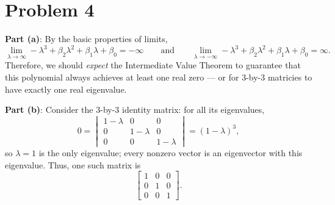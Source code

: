 \documentclass[11pt]{article}
\begin{document}
\section{Problem 4}

\textbf{Part (a)}: By the basic properties of limits,
\[
	\lim\limits_{\lambda \to \infty} -\lambda^{3} + \beta_{2} \lambda^{2} + \beta_{1} \lambda + \beta_{0} = -\infty \qquad \text{and} \qquad \lim\limits_{\lambda \to -\infty} -\lambda^{3} + \beta_{2} \lambda^{2} + \beta_{1} \lambda + \beta_{0} = \infty.
\]
Therefore, we should \textit{expect} the Intermediate Value Theorem to guarantee that this polynomial always achieves at least one real zero --- or for $3$-by-$3$ matricies to have exactly one real eigenvalue.

\textbf{Part (b)}: Consider the $3$-by-$3$ identity matrix: for all its eigenvalues,
\[
	0 = \begin{vmatrix} 1 - \lambda & 0 & 0 \\ 0 & 1 - \lambda & 0 \\ 0 & 0 & 1 - \lambda \end{vmatrix} = (1 - \lambda)^{3},
\]
so $\lambda = 1$ is the only eigenvalue; every nonzero vector is an eigenvector with this eigenvalue. Thus, one such matrix is
\[
	\boxed{ \begin{bmatrix} 1 & 0 & 0 \\ 0 & 1 & 0 \\ 0 & 0 & 1 \end{bmatrix}}.
\]

\end{document}
